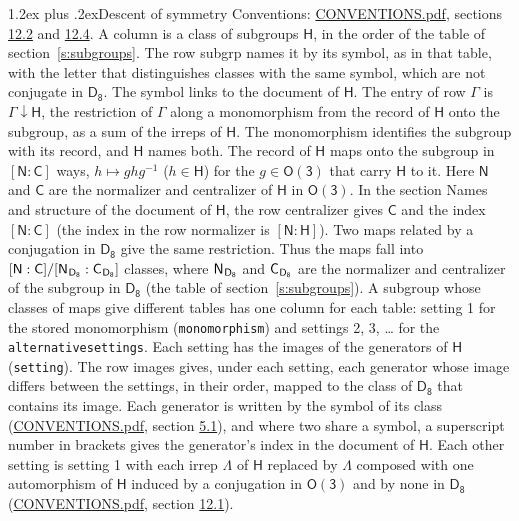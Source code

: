 \documentclass[10pt,a4paper]{article}
\makeatletter
\renewcommand\section{\@startsection{section}{1}{\z@}{-3ex plus -1ex minus -.2ex}%
  {1.2ex plus .2ex}{\normalfont\large\sffamily\bfseries\color{parttitle}}}
\numberwithin{equation}{section}
\newcommand{\grp}[1]{\mathsf{#1}}
\newcommand{\grpindex}[2]{[#1 : #2]}
\newcommand{\restr}[2]{#1\!\downarrow#2}
\newcommand{\hairsp}{\mkern1mu}
\makeatother
\begin{document}
\section{Descent of symmetry}\label{s:subduction}
Conventions: \href{../../CONVENTIONS.pdf}{CONVENTIONS.pdf}, sections \href{../../CONVENTIONS.pdf\#conv.12.2}{12.2} and \href{../../CONVENTIONS.pdf\#conv.12.4}{12.4}.
A column is a class of subgroups $\grp{H}$, in the order of the table of section~\ref{s:subgroups}. The row subgrp names it by its symbol, as in that table, with the letter that distinguishes classes with the same symbol, which are not conjugate in $\grp{D_{8}}$. The symbol links to the document of $\grp{H}$. The entry of row $\Gamma$ is $\restr{\Gamma}{\grp{H}}$, the restriction of $\Gamma$ along a monomorphism from the record of $\grp{H}$ onto the subgroup, as a sum of the irreps of $\grp{H}$. The monomorphism identifies the subgroup with its record, and $\grp{H}$ names both. \label{n:group.normalizer.o3}\label{n:group.centralizer.o3}The record of $\grp{H}$ maps onto the subgroup in $\grpindex{\grp{N}}{\grp{C}}$ ways, $h \mapsto g h g^{-1}$ ($h \in \grp{H}$) for the $g \in \grp{O(3)}$ that carry $\grp{H}$ to it. Here $\grp{N}$ and $\grp{C}$ are the normalizer and centralizer of $\grp{H}$ in \href{O3.pdf}{$\grp{O(3)}$}. In the section Names and structure of the document of $\grp{H}$, the row centralizer gives $\grp{C}$ and the index $\grpindex{\grp{N}}{\grp{C}}$ (the index in the row normalizer is $\grpindex{\grp{N}}{\grp{H}}$). Two maps related by a conjugation in $\grp{D_{8}}$ give the same restriction. Thus the maps fall into $\grpindex{\grp{N}}{\grp{C}}/\grpindex{\grp{N}_{\hairsp \grp{D_{8}}}}{\grp{C}_{\hairsp \grp{D_{8}}}}$ classes, where $\grp{N}_{\hairsp \grp{D_{8}}}$ and $\grp{C}_{\hairsp \grp{D_{8}}}$ are the normalizer and centralizer of the subgroup in $\grp{D_{8}}$ (the table of section~\ref{s:subgroups}). \label{n:head.setting}A subgroup whose classes of maps give different tables has one column for each table: setting 1 for the stored monomorphism (\texttt{monomorphism}) and settings 2, 3, \dots{} for the \texttt{alternativesettings}. Each setting has the images of the generators of $\grp{H}$ (\texttt{setting}). \label{n:head.images}The row images gives, under each setting, each generator whose image differs between the settings, in their order, mapped to the class of $\grp{D_{8}}$ that contains its image. \label{n:element.generator.index}Each generator is written by the symbol of its class (\href{../../CONVENTIONS.pdf}{CONVENTIONS.pdf}, section \href{../../CONVENTIONS.pdf\#conv.5.1}{5.1}), and where two share a symbol, a superscript number in brackets gives the generator's index in the document of $\grp{H}$. \label{n:irrep.Delta}Each other setting is setting 1 with each irrep $\Lambda$ of $\grp{H}$ replaced by $\Lambda$ composed with one automorphism of $\grp{H}$ induced by a conjugation in \href{O3.pdf}{$\grp{O(3)}$} and by none in $\grp{D_{8}}$ (\href{../../CONVENTIONS.pdf}{CONVENTIONS.pdf}, section \href{../../CONVENTIONS.pdf\#conv.12.1}{12.1}).
\end{document}
